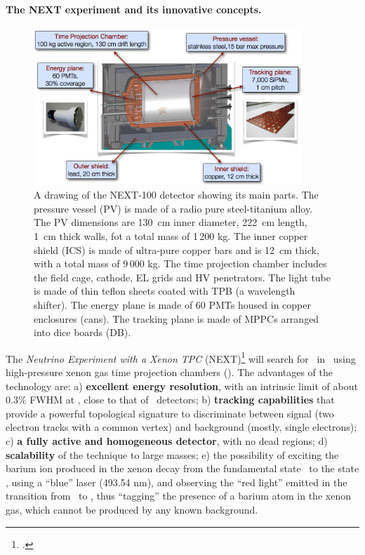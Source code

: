 \paragraph{The NEXT experiment and its innovative concepts.}
\begin{figure}
\centering
\includegraphics[width=0.9\textwidth]{img/NEXT.png}
\caption{\small A drawing of the NEXT-100 detector showing its main parts. The pressure vessel (PV) is made of a radio pure steel-titanium alloy. The PV dimensions are 130~cm inner diameter, 222~cm length, 1~cm thick walls, fot a total mass of 1\,200 kg. The inner copper shield (ICS) is made of ultra-pure copper bars and is 12~cm thick, with a total mass of 9\,000 kg. The time projection chamber includes the field cage, cathode, EL grids and HV penetrators.
The light tube is made of thin teflon sheets coated with TPB (a wavelength shifter). 
The energy plane is made of 60 PMTs housed in copper enclosures (cans).
The tracking plane is made of MPPCs arranged into dice boards (DB). 
} \label{fig.NEXT100}
\end{figure}

The \emph{Neutrino Experiment with a Xenon TPC} (NEXT)\footcite{next} will search for \bbonu\ in \XE\ using  high-pressure xenon gas  time projection chambers (\HPXE). The advantages of the technology are: 
a) {\bf excellent energy resolution}, with an intrinsic limit of about 0.3\% FWHM at \Qbb, close to that of \GE\ detectors; b)
{\bf tracking capabilities} that provide a powerful topological signature to discriminate between signal (two electron tracks with a common vertex) and background (mostly, single electrons); c)
{\bf a fully active and homogeneous detector}, with no dead regions; d) {\bf scalability} of the technique to large masses; e) the possibility of exciting the barium ion produced in the xenon decay from the fundamental state \TwoS\ to the state \TwoP, using a ``blue'' laser (493.54 nm), and observing the ``red light'' emitted in the transition from \TwoP\ to \TwoD, thus ``tagging'' the presence of a barium atom in the xenon gas, which cannot be produced by any known background. 

